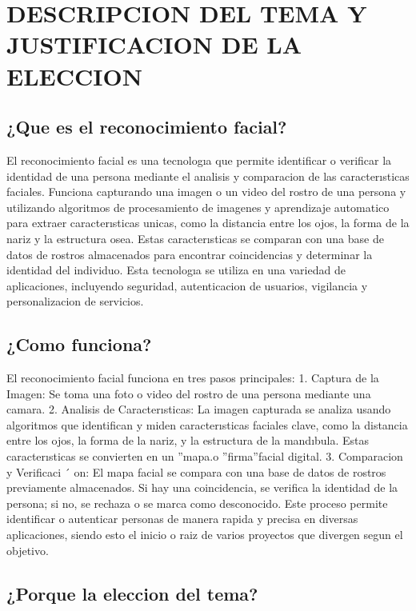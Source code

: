 \documentclass[conference]{IEEEtran}
\begin{document}
\section{DESCRIPCION DEL TEMA Y JUSTIFICACION DE LA
ELECCION}

\subsection{¿Que es el reconocimiento facial?
}

El reconocimiento facial es una tecnologıa que permite
identificar o verificar la identidad de una persona mediante
el analisis y comparacion de las caracterısticas faciales. Funciona capturando una imagen o un video del rostro de una
persona y utilizando algoritmos de procesamiento de imagenes
y aprendizaje automatico para extraer caracterısticas unicas,
como la distancia entre los ojos, la forma de la nariz y la
estructura osea. Estas caracterısticas se comparan con una base
de datos de rostros almacenados para encontrar coincidencias
y determinar la identidad del individuo. Esta tecnologıa se
utiliza en una variedad de aplicaciones, incluyendo seguridad,
autenticacion de usuarios, vigilancia y personalizacion de
servicios.

\subsection{¿Como funciona?}

El reconocimiento facial funciona en tres pasos principales:
1. Captura de la Imagen: Se toma una foto o video del
rostro de una persona mediante una camara.
2. Analisis de Caracterısticas: La imagen capturada se
analiza usando algoritmos que identifican y miden caracterısticas faciales clave, como la distancia entre los ojos,
la forma de la nariz, y la estructura de la mandıbula.
Estas caracterısticas se convierten en un ”mapa.o ”firma”facial digital.
3. Comparacion y Verificaci ´ on: El mapa facial se compara
con una base de datos de rostros previamente almacenados. Si hay una coincidencia, se verifica la identidad
de la persona; si no, se rechaza o se marca como
desconocido.
Este proceso permite identificar o autenticar personas de
manera rapida y precisa en diversas aplicaciones, siendo esto
el inicio o raiz de varios proyectos que divergen segun el
objetivo.


\subsection{¿Porque la eleccion del tema?}
\end{document}
